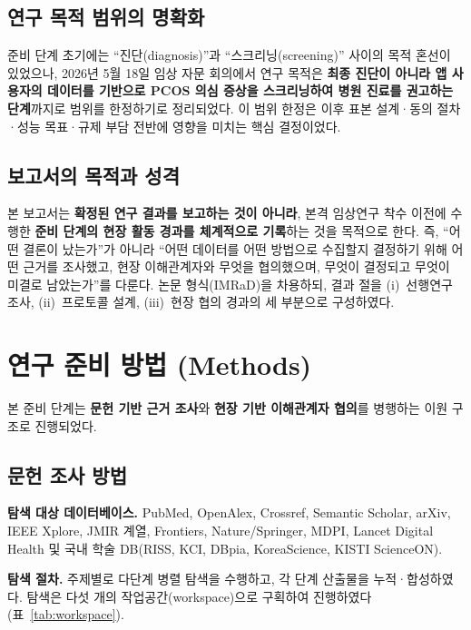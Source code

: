 \documentclass[11pt,a4paper]{article}
\begin{document}
\subsection{연구 목적 범위의 명확화}
준비 단계 초기에는 ``진단(diagnosis)''과 ``스크리닝(screening)'' 사이의 목적 혼선이 있었으나, 2026년 5월 18일 임상 자문 회의에서 연구 목적은 \textbf{최종 진단이 아니라 앱 사용자의 데이터를 기반으로 PCOS 의심 증상을 스크리닝하여 병원 진료를 권고하는 단계}까지로 범위를 한정하기로 정리되었다. 이 범위 한정은 이후 표본 설계·동의 절차·성능 목표·규제 부담 전반에 영향을 미치는 핵심 결정이었다.

\subsection{보고서의 목적과 성격}
본 보고서는 \textbf{확정된 연구 결과를 보고하는 것이 아니라}, 본격 임상연구 착수 이전에 수행한 \textbf{준비 단계의 현장 활동 경과를 체계적으로 기록}하는 것을 목적으로 한다. 즉, ``어떤 결론이 났는가''가 아니라 ``어떤 데이터를 어떤 방법으로 수집할지 결정하기 위해 어떤 근거를 조사했고, 현장 이해관계자와 무엇을 협의했으며, 무엇이 결정되고 무엇이 미결로 남았는가''를 다룬다. 논문 형식(IMRaD)을 차용하되, 결과 절을 (i)~선행연구 조사, (ii)~프로토콜 설계, (iii)~현장 협의 경과의 세 부분으로 구성하였다.

\section{연구 준비 방법 (Methods)}
본 준비 단계는 \textbf{문헌 기반 근거 조사}와 \textbf{현장 기반 이해관계자 협의}를 병행하는 이원 구조로 진행되었다.

\subsection{문헌 조사 방법}
\textbf{탐색 대상 데이터베이스.} PubMed, OpenAlex, Crossref, Semantic Scholar, arXiv, IEEE Xplore, JMIR 계열, Frontiers, Nature/Springer, MDPI, Lancet Digital Health 및 국내 학술 DB(RISS, KCI, DBpia, KoreaScience, KISTI ScienceON).

\smallskip
\noindent\textbf{탐색 절차.} 주제별로 다단계 병렬 탐색을 수행하고, 각 단계 산출물을 누적·합성하였다. 탐색은 다섯 개의 작업공간(workspace)으로 구획하여 진행하였다(표~\ref{tab:workspace}).
\end{document}
